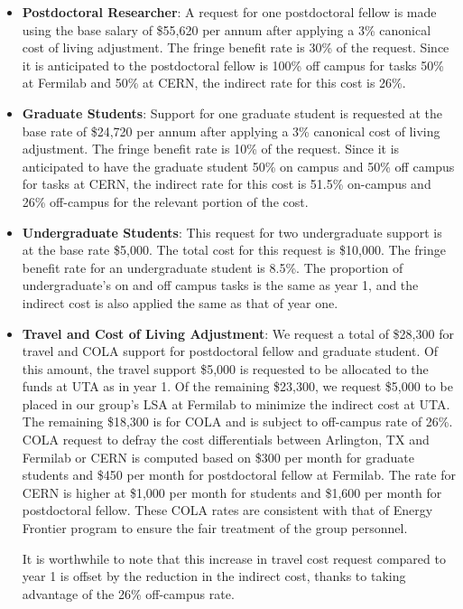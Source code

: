 \begin{enumerate}
\begin{itemize}[noitemsep,nolistsep]
\item {{\bf Postdoctoral Researcher}: A request for one postdoctoral fellow is made using the base salary of \$55,620 per annum after applying a 3\% canonical cost of living adjustment.  The fringe benefit rate is 30\% of the request.  Since it is anticipated to the postdoctoral fellow is 100\% off campus for tasks 50\% at Fermilab and 50\% at CERN, the indirect rate for this cost is 26\%.} 

\item{{\bf Graduate Students}: Support for one graduate student is requested at the base rate of \$24,720 per annum after applying a 3\% canonical cost of living adjustment.   The fringe benefit rate is 10\% of the request.  Since it is anticipated to have the graduate student 50\% on campus and 50\% off campus for tasks at CERN, the indirect rate for this cost is 51.5\% on-campus and 26\% off-campus for the relevant portion of the cost.  }

\item {{\bf Undergraduate Students}: This request for two undergraduate support is at the base rate \$5,000.  The total cost for this request is \$10,000.  The fringe benefit rate for an undergraduate student is 8.5\%.  The proportion of undergraduate’s on and off campus tasks is the same as year 1, and the indirect cost is also applied the same as that of year one.}

\item{{\bf Travel and Cost of Living Adjustment}: We request a total of \$28,300 for travel and COLA support for postdoctoral fellow and graduate student.   Of this amount, the travel support \$5,000 is requested to be allocated to the funds at UTA as in year 1.  Of the remaining \$23,300, we request \$5,000 to be placed in our group’s LSA at Fermilab to minimize the indirect cost at UTA.   The remaining \$18,300 is for COLA and is subject to off-campus rate of 26\%.  COLA request to defray the cost differentials between Arlington, TX and Fermilab or CERN is computed based on \$300 per month for graduate students and \$450 per month for postdoctoral fellow at Fermilab.  The rate for CERN is higher at \$1,000 per month for students and \$1,600 per month for postdoctoral fellow.  These COLA rates are consistent with that of Energy Frontier program to ensure the fair treatment of the group personnel.  

It is worthwhile to note that this increase in travel cost request compared to year 1 is offset by the reduction in the indirect cost, thanks to taking advantage of the 26\% off-campus rate.}


\end{itemize}
\end{enumerate}
